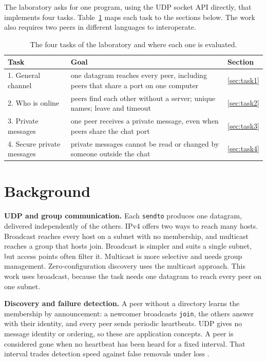 \documentclass[12pt,a4paper]{article}
\begin{document}
The laboratory asks for one program, using the UDP socket API directly, that
implements four tasks. Table~\ref{tab:tasks} maps each task to the sections below.
The work also requires two peers in different languages to interoperate.

\begin{table}[H]
\centering
\small
\begin{tabularx}{\textwidth}{@{}l X l@{}}
\toprule
\textbf{Task} & \textbf{Goal} & \textbf{Section} \\
\midrule
1. General channel & one datagram reaches every peer, including peers that share a port on one computer & \ref{sec:task1} \\
2. Who is online & peers find each other without a server; unique names; leave and timeout & \ref{sec:task2} \\
3. Private messages & one peer receives a private message, even when peers share the chat port & \ref{sec:task3} \\
4. Secure private messages & private messages cannot be read or changed by someone outside the chat & \ref{sec:task4} \\
\bottomrule
\end{tabularx}
\caption{The four tasks of the laboratory and where each one is evaluated.}
\label{tab:tasks}
\end{table}

\section{Background}
\textbf{UDP and group communication.} Each \texttt{sendto} produces one datagram,
delivered independently of the others. IPv4 offers two ways to reach
many hosts. Broadcast reaches every host on a subnet with no membership, and
multicast reaches a group that hosts join. Broadcast is simpler
and suits a single subnet, but access points often filter it. Multicast is more
selective and needs group management. Zero-configuration discovery uses the
multicast approach. This work uses broadcast, because the task
needs one datagram to reach every peer on one subnet.

\textbf{Discovery and failure detection.} A peer without a directory learns the
membership by announcement: a newcomer broadcasts \texttt{join}, the others answer
with their identity, and every peer sends periodic heartbeats. UDP gives no
message identity or ordering, so these are application concepts.
A peer is considered gone when no heartbeat has been heard for a fixed interval.
That interval trades detection speed against false removals under loss
.
\end{document}
